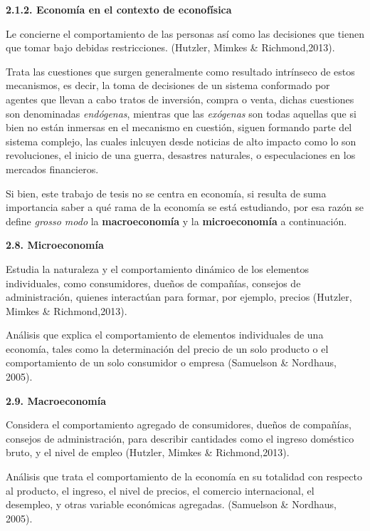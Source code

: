{
\Large  \textbf{2.1.2. Economía en el contexto de econofísica} 
}

Le concierne el comportamiento de las personas así como las decisiones que tienen que tomar bajo debidas restricciones. (Hutzler, Mimkes \& Richmond,2013).
\newline


Trata las cuestiones que surgen generalmente como resultado intrínseco de estos mecanismos, es decir, la toma de decisiones de un sistema conformado por agentes que llevan a cabo tratos de inversión, compra o venta, dichas cuestiones son denominadas \textit{endógenas}, mientras que las \textit{exógenas} son todas aquellas que si bien no están inmersas en el mecanismo en cuestión, siguen formando parte del sistema complejo, las cuales inlcuyen desde noticias de alto impacto como lo son revoluciones, el inicio de una guerra, desastres naturales, o especulaciones en los mercados financieros.  
\newline

Si bien, este trabajo de tesis no se centra en economía, si resulta de suma importancia saber a qué rama de la economía se está estudiando, por esa razón se define \textit{grosso modo} la \textbf{macroeconomía} y la \textbf{microeconomía} a continuación.
\newline

{
\Large  \textbf{2.8. Microeconomía} 
}

Estudia la naturaleza y el comportamiento dinámico de los elementos individuales, como consumidores, dueños de compañías, consejos de administración, quienes interactúan para formar, por ejemplo, precios (Hutzler, Mimkes \& Richmond,2013).
\newline

Análisis que explica el comportamiento de elementos individuales de una economía, tales como la determinación del precio de un solo producto o el comportamiento de un solo consumidor o empresa (Samuelson \& Nordhaus, 2005).
\newline

{
\Large  \textbf{2.9. Macroeconomía} 
}

Considera el comportamiento agregado de consumidores, dueños de compañías, consejos de administración, para describir cantidades como el ingreso doméstico bruto, y el nivel de empleo  (Hutzler, Mimkes \& Richmond,2013).
\newline

Análisis que trata el comportamiento de la economía en su totalidad con respecto al producto, el ingreso, el nivel de precios, el comercio internacional, el desempleo, y otras variable económicas agregadas. (Samuelson \& Nordhaus, 2005).
\newline

